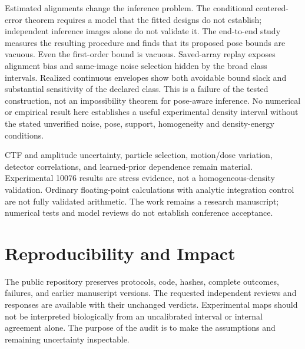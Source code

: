 \documentclass{article}
\begin{document}
Estimated alignments change the inference problem. The conditional centered-error theorem requires a model that the fitted designs do not establish; independent inference images alone do not validate it. The end-to-end study measures the resulting procedure and finds that its proposed pose bounds are vacuous. Even the first-order bound is vacuous. Saved-array replay exposes alignment bias and same-image noise selection hidden by the broad class intervals. Realized continuous envelopes show both avoidable bound slack and substantial sensitivity of the declared class. This is a failure of the tested construction, not an impossibility theorem for pose-aware inference. No numerical or empirical result here establishes a useful experimental density interval without the stated unverified noise, pose, support, homogeneity and density-energy conditions.

CTF and amplitude uncertainty, particle selection, motion/dose variation, detector correlations, and learned-prior dependence remain material. Experimental 10076 results are stress evidence, not a homogeneous-density validation. Ordinary floating-point calculations with analytic integration control are not fully validated arithmetic. The work remains a research manuscript; numerical tests and model reviews do not establish conference acceptance.

\section*{Reproducibility and Impact}
The public repository preserves protocols, code, hashes, complete outcomes, failures, and earlier manuscript versions. The requested independent reviews and responses are available with their unchanged verdicts. Experimental maps should not be interpreted biologically from an uncalibrated interval or internal agreement alone. The purpose of the audit is to make the assumptions and remaining uncertainty inspectable.



\clearpage
\appendix


\onecolumn
\twocolumn


\end{document}
